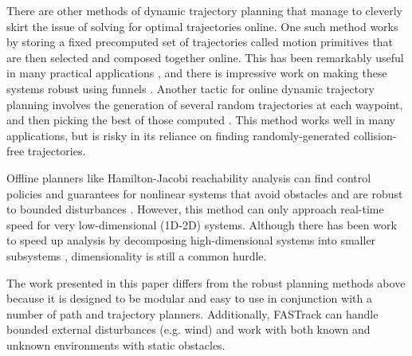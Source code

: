 There are other methods of dynamic trajectory planning that manage to cleverly skirt the issue of solving for optimal trajectories online.  One such method works by storing a fixed precomputed set of trajectories called motion primitives that are then selected and composed together online.  This has been remarkably useful in many practical applications \cite{Gillula2010, Dey2016, Barry2016}, and there is impressive work on making these systems robust using funnels \cite{Majumdar2016}.  Another tactic for online dynamic trajectory planning involves the generation of several random trajectories at each waypoint, and then picking the best of those computed \cite{Kalakrishnan2011, Schwesinger2013, Krusi2015}.  This method works well in many applications, but is risky in its reliance on finding randomly-generated collision-free trajectories.  

Offline planners like Hamilton-Jacobi reachability analysis can find control policies and guarantees for nonlinear systems that avoid obstacles and are robust to bounded disturbances \cite{Mitchell05}.  However, this method can only approach real-time speed for very low-dimensional (1D-2D) systems. Although there has been work to speed up analysis by decomposing high-dimensional systems into smaller subsystems \cite{Chen2016a, Chen2016b}, dimensionality is still a common hurdle.

The work presented in this paper differs from the robust planning methods above because it is designed to be modular and easy to use in conjunction with a number of path and trajectory planners. Additionally, FASTrack can handle bounded external disturbances (e.g. wind) and work with both known and unknown environments with static obstacles. 